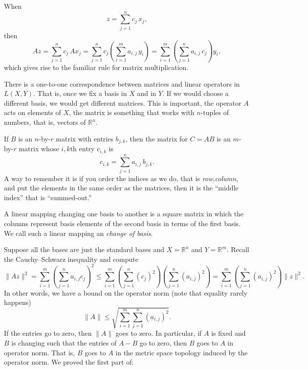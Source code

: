 \documentclass[12pt]{book}
\newcommand{\snorm}[1]{\lVert {#1} \rVert}
\newcommand{\R}{{\mathbb{R}}}
\newcommand{\myindex}[1]{#1\index{#1}}
\theoremstyle{plain}
\theoremstyle{remark}
\theoremstyle{definition}
\theoremstyle{exercise}
\theoremstyle{example}
\begin{document}
When
\begin{equation*}
z = \sum_{j=1}^n c_j \, x_j ,
\end{equation*}
then
\begin{equation*}
A z =
\sum_{j=1}^n c_j \, A x_j 
=
\sum_{j=1}^n c_j \left( \sum_{i=1}^m  a_{i,j}\, y_i \right) 
=
\sum_{i=1}^m \left(\sum_{j=1}^n  a_{i,j}\, c_j \right) y_i ,
\end{equation*}
which gives rise to the familiar rule for matrix multiplication.

There is a one-to-one correspondence between matrices and linear operators in
$L(X,Y)$.  That is, once we fix a basis in $X$ and in $Y$.  If we would
choose a different basis, we would get different matrices.  This is
important, the operator $A$ acts on elements of $X$, the matrix
is something that works with $n$-tuples of numbers, that is, vectors of
$\R^n$.

If $B$ is an $n$-by-$r$ matrix with entries $b_{j,k}$, then 
the matrix for $C = AB$ is an $m$-by-$r$ matrix whose $i,k$th entry
$c_{i,k}$ is
\begin{equation*}
c_{i,k} =
\sum_{j=1}^n a_{i,j}\,b_{j,k} .
\end{equation*}
A way to remember it is if you order the indices as we do, that is
\emph{row,column}, and put the elements in the same order as the matrices,
then it is the ``middle index'' that is ``summed-out.''

A linear mapping changing one basis to another is a
square matrix in which the columns represent basis elements
of the second basis in terms of the first basis.  We call such a linear
mapping an \emph{\myindex{change of basis}}.

Suppose all the bases are just the standard bases and
$X=\R^n$ and $Y=\R^m$. 
Recall the Cauchy--Schwarz inequality and compute
\begin{equation*}
\snorm{Az}^2
=
\sum_{i=1}^m { \left(\sum_{j=1}^n a_{i,j} c_j \right)}^2
\leq
\sum_{i=1}^m { \left(\sum_{j=1}^n {(c_j)}^2 \right) \left(\sum_{j=1}^n
{(a_{i,j})}^2 \right) }
=
\sum_{i=1}^m \left(\sum_{j=1}^n {(a_{i,j})}^2 \right)
\snorm{z}^2 .
\end{equation*}
In other words, we have a bound on the operator norm (note that equality
rarely happens)
\begin{equation*}
\snorm{A} \leq
\sqrt{\sum_{i=1}^m \sum_{j=1}^n {(a_{i,j})}^2} .
\end{equation*}
If the entries go to zero, then $\snorm{A}$ goes to zero.  In
particular, if $A$ is fixed and $B$ is changing such
that the entries of $A-B$ go to zero, then $B$ goes to $A$
in operator norm.  That is, $B$ goes to $A$
in the metric space topology induced by the
operator norm.  We proved the first part of:
\end{document}
